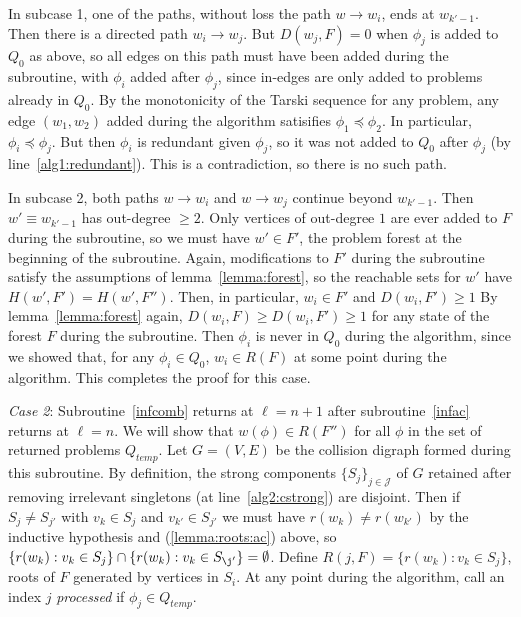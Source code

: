 \documentclass[11pt,reqno]{amsart}
\theoremstyle{definition}
\numberwithin{equation}{section}
\newcommand{\pre}{\phi}
\newcommand{\peq}{\preceq}
\newcommand{\strongcomp}{S}
\newcommand{\acto}{Q_0}
\newcommand{\actt}{Q_{temp}}
\newcommand{\reach}{H}
\newcommand{\forest}{F}
\newcommand{\roott}{R}
\newcommand{\depth}{D}
\begin{document}
\begin{enumerate}
In subcase 1, one of the paths, without loss the path $w \to w_i$, ends at $w_{k'-1}$. 
Then there is a directed path $w_i \to w_j$.
But $\depth(w_j, \forest) = 0$ when $\pre_j$ is added to $\acto$ as above, so all edges on this path must have been added during the subroutine, with $\pre_i$ added after $\pre_j$, since in-edges are only added to problems already in $\acto$. %
By the monotonicity of the Tarski sequence for any problem, any edge $(w_1,w_2)$ added during the algorithm satisifies $\pre_1 \peq \pre_2$. 
In particular, $\pre_i \peq \pre_j$. 
But then $\pre_i$ is redundant given $\pre_j$, so it was not added to $\acto$ after $\pre_j$ (by line~\ref{alg1:redundant}). 
This is a contradiction, so there is no such path.

In subcase 2, both paths $w \to w_i$ and $w \to w_j$ continue beyond $w_{k'-1}$.
Then $w' \equiv w_{k' - 1}$ has out-degree $\geq 2$.
Only vertices of out-degree $1$ are ever added to $\forest$ during the subroutine, so we must have $w' \in \forest'$, the problem forest at the beginning of the subroutine.
Again, modifications to $\forest'$ during the subroutine satisfy the assumptions of lemma~\ref{lemma:forest}, so the reachable sets for $w'$ have $\reach(w',\forest') = \reach(w',\forest'')$.  
Then, in particular, $w_i \in \forest'$ and $\depth(w_i, \forest') \geq 1$
By lemma~\ref{lemma:forest} again, $\depth(w_i, \forest) \geq \depth(w_i, \forest') \geq 1$  for any state of the forest $\forest$ during the subroutine. 
Then $\pre_i$ is never in $\acto$ during the algorithm, since we showed that, for any $\pre_i \in \acto$, $w_i \in \roott(\forest)$ at some point during the algorithm. 
This completes the proof for this case.

\emph{Case 2}: Subroutine~\ref{infcomb} returns at $\ell = n +1$ after subroutine~\ref{infac} returns at $\ell = n$. 
We will show that $w(\pre) \in \roott(\forest'')$ for all $\pre$ in the set of returned problems $\actt$.
Let $G = (V,E)$ be the collision digraph formed during this subroutine.
By definition, the strong components $\{\strongcomp_j\}_{j \in \mathcal{J}}$ of $G$ retained after removing irrelevant singletons (at line~\ref{alg2:cstrong}) are disjoint. 
Then if $\strongcomp_j \not = \strongcomp_{j'}$ with $v_k \in \strongcomp_j$ and $v_{k'} \in \strongcomp_{j'}$ we must have $r(w_k) \not = r(w_{k'})$ by the inductive hypothesis and (\ref{lemma:roots:ac}) above, so $\{r(w_k): v_k \in \strongcomp_j\} \cap \{r(w_k): v_k \in \strongcomp_{\j'}\} = \emptyset$. 
Define $R(j,\forest) = \{r(w_k): v_k \in \strongcomp_j\}$, roots of $\forest$ generated by vertices in $\strongcomp_i$. 
At any point during the algorithm, call an index $j$ \emph{processed} if $\pre_j \in \actt$.


\end{enumerate}
\end{document}

